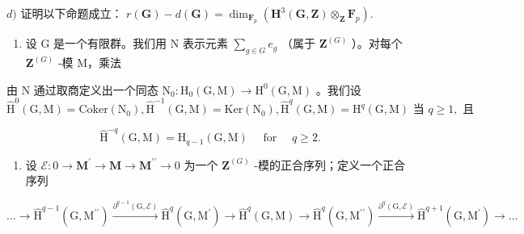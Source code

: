 \(d)\) 证明以下命题成立： \(r(\mathbf{G}) - d(\mathbf{G}) = \dim_{\mathbf{F}_p}(\mathbf{H}^3 (\mathbf{G},\mathbf{Z})\otimes_{\mathbf{Z}}\mathbf{F}_p).\)

\begin{enumerate}
\def\labelenumi{\arabic{enumi})}
\setcounter{enumi}{16}
\tightlist
\item
  设 G 是一个有限群。我们用 N 表示元素 \(\sum_{g\in G}e_g\) （属于 \(\mathbf{Z}^{(G)}\) ）。对每个 \(\mathbf{Z}^{(G)}\) -模 M，乘法
\end{enumerate}

由 N 通过取商定义出一个同态 \(\mathrm{N}_{0}:\mathrm{H}_{0}(\mathrm{G},\mathrm{M})\to\mathrm{H}^{0}(\mathrm{G},\mathrm{M})\) 。我们设 \(\hat{\mathrm{H}}^{0}(\mathrm{G},\mathrm{M})=\mathrm{Coker}(\mathrm{N}_{0}),\hat{\mathrm{H}}^{-1}(\mathrm{G},\mathrm{M})=\mathrm{Ker}(\mathrm{N}_{0}),\hat{\mathrm{H}}^{q}(\mathrm{G},\mathrm{M})=\mathrm{H}^{q}(\mathrm{G},\mathrm{M})\text{ 当 } q\geqslant1,\text{ 且}\)

\[
\hat {\mathrm{H}} ^ {- q} (\mathrm{G}, \mathrm{M}) = \mathrm{H} _ {q - 1} (\mathrm{G}, \mathrm{M}) \quad \text { for } \quad q \geqslant 2.
\]

\begin{enumerate}
\def\labelenumi{\alph{enumi})}
\tightlist
\item
  设 \(\mathcal{E}:0\to\mathbf{M}^{\prime}\to\mathbf{M}\to\mathbf{M}^{\prime\prime}\to0\) 为一个 \(\mathbf{Z}^{(G)}\) -模的正合序列；定义一个正合序列
\end{enumerate}

\[
\dots \rightarrow \hat {\mathrm{H}} ^ {q - 1} (\mathrm{G}, \mathrm{M} ^ {\prime \prime}) \xrightarrow {\partial^ {q - 1} (\mathrm{G} , \mathcal {E})} \hat {\mathrm{H}} ^ {q} (\mathrm{G}, \mathrm{M} ^ {\prime}) \rightarrow \hat {\mathrm{H}} ^ {q} (\mathrm{G}, \mathrm{M}) \rightarrow \hat {\mathrm{H}} ^ {q} (\mathrm{G}, \mathrm{M} ^ {\prime \prime}) \xrightarrow {\partial^ {q} (\mathrm{G} , \mathcal {E})} \hat {\mathrm{H}} ^ {q + 1} (\mathrm{G}, \mathrm{M} ^ {\prime}) \rightarrow \dots
\]

